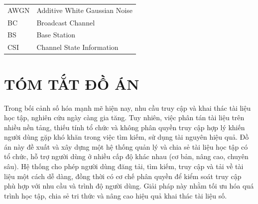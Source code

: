 \documentclass{article}
\begin{document}
	\begin{tabular}{ l l }
		\hspace{1cm} AWGN & \hspace{4cm} Additive White Gaussian Noise \\  
		\hspace{1cm} BC & \hspace{4cm} Broadcast Channel    \\
		\hspace{1cm} BS  & \hspace{4cm} Base Station\\
		\hspace{1cm} CSI & \hspace{4cm} Channel State Information \\  
	\end{tabular}  
	
	\newpage
	
	\renewcommand{\listfigurename}{DANH MỤC HÌNH VẼ}
	{\let\oldnumberline\numberline
		\renewcommand{\numberline}{Hình~\oldnumberline}
		\listoffigures} 
	\newpage
	
	\renewcommand{\listtablename}{DANH MỤC BẢNG BIỂU}
	{\let\oldnumberline\numberline
		\renewcommand{\numberline}{Bảng~\oldnumberline}
		\listoftables}
	\newpage
	
	\section*{TÓM TẮT ĐỒ ÁN}
	Trong bối cảnh số hóa mạnh mẽ hiện nay, nhu cầu truy cập và khai thác tài liệu học tập, nghiên cứu ngày càng gia tăng. Tuy nhiên, việc phân tán tài liệu trên nhiều nền tảng, thiếu tính tổ chức và không phân quyền truy cập hợp lý khiến người dùng gặp khó khăn trong việc tìm kiếm, sử dụng tài nguyên hiệu quả. Đồ án này đề xuất và xây dựng một hệ thống quản lý và chia sẻ tài liệu học tập có tổ chức, hỗ trợ người dùng ở nhiều cấp độ khác nhau (cơ bản, nâng cao, chuyên sâu). Hệ thống cho phép người dùng đăng tải, tìm kiếm, truy cập và tải về tài liệu một cách dễ dàng, đồng thời có cơ chế phân quyền để kiểm soát truy cập phù hợp với nhu cầu và trình độ người dùng. Giải pháp này nhằm tối ưu hóa quá trình học tập, chia sẻ tri thức và nâng cao hiệu quả khai thác tài liệu số.
	
\end{document}
